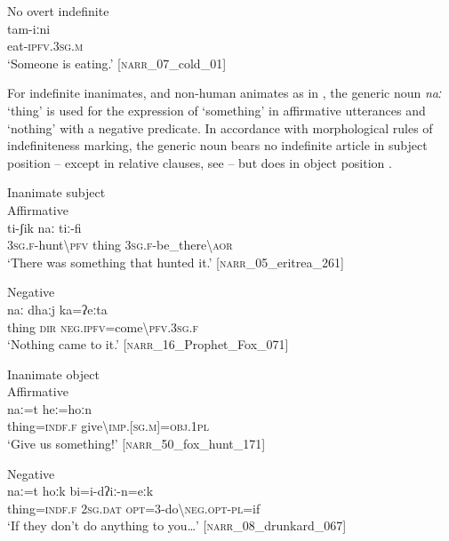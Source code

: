 \documentclass[output=paper,colorlinks,citecolor=brown]{langscibook}
\begin{document}
\ea\label{ex:beja:34}
{No overt indefinite}\\
    \gll tam-iːni\\
         eat-\textsc{ipfv.3sg.m}\\
    \glt `Someone is eating.' [\textsc{narr}\_07\_cold\_01]
\z

For indefinite inanimates, and non-human animates as in , the generic noun \textit{naː} ‘thing’ is used for the expression of ‘something’ in affirmative utterances and ‘nothing’ with a negative predicate. In accordance with morphological rules of indefiniteness marking, the generic noun bears no indefinite article in subject position  – except in relative clauses, see  – but does in object position . 

\ea\label{ex:beja:35} 
{Inanimate subject}\\
    \ea\label{ex:beja:35a}
    {Affirmative}\\
        \gll ti-ʃik naː tiː-fi\\
             \textsc{3sg.f}-hunt{\textbackslash}\textsc{pfv} thing \textsc{3sg.f-}be\_there{\textbackslash}\textsc{aor}\\
        \glt `There was something that hunted it.' [\textsc{narr}\_05\_eritrea\_261]
    
    \ex\label{ex:beja:35b}
    {Negative}\\
        \gll naː dhaːj ka=ʔeːta\\
             thing \textsc{dir} \textsc{neg.ipfv=}come{\textbackslash}\textsc{pfv.3sg.f}\\
        \glt `Nothing came to it.' [\textsc{narr}\_16\_Prophet\_Fox\_071]
    \z    
\z 
        
\ea\label{ex:beja:36}
    {Inanimate object}\\
    
    \ea\label{ex:beja:36a}
    {Affirmative}\\
        \gll naː=t heː=hoːn\\
             thing\textsc{=indf.f} give{\textbackslash}\textsc{imp.[sg.m]=obj.1pl}\\
        \glt `Give us something!' [\textsc{narr}\_50\_fox\_hunt\_171]
    
    \ex\label{ex:beja:36b}
    {Negative}\\
        \gll naː=t hoːk bi=i-dʔiː-n=eːk\\
             thing=\textsc{indf.f} \textsc{2sg.dat} \textsc{opt=3}-do{\textbackslash}\textsc{neg.opt-pl}=if\\
        \glt `If they don’t do anything to you…' [\textsc{narr}\_08\_drunkard\_067]
    \z
\z 
\end{document}
